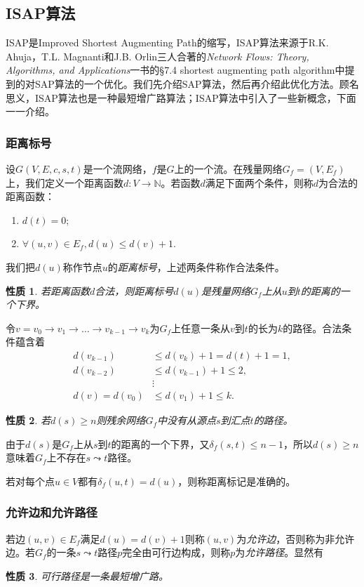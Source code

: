 \documentclass{ctexbook}
\newtheorem{property}{性质}[chapter]
\begin{document}

  \subsection{ISAP算法}
  ISAP是Improved Shortest Augmenting Path的缩写，ISAP算法来源于R.K. Ahuja，T.L. Magnanti和J.B. Orlin三人合著的\emph{Network Flows: Theory, Algorithms, and Applications}一书的\S 7.4 shortest augmenting path algorithm中提到的对SAP算法的一个优化。我们先介绍SAP算法，然后再介绍此优化方法。顾名思义，ISAP算法也是一种最短增广路算法；ISAP算法中引入了一些新概念，下面一一介绍。
  \subsubsection*{距离标号}
  设$G(V,E,c,s,t)$是一个流网络，$f$是$G$上的一个流。在残量网络$G_f=(V,E_f)$上，我们定义一个距离函数$d\colon V\to\mathbb{N}$。若函数$d$满足下面两个条件，则称$d$为合法的距离函数：
  \begin{enumerate}
      \item $d(t) = 0$;
      \item $\forall (u,v)\in E_f, d(u) \le d(v) +1$.
  \end{enumerate}
  我们把$d(u)$称作节点$u$的\emph{距离标号}，上述两条件称作合法条件。
  \begin{property}\label{P:lower_bound}
      若距离函数$d$合法，则距离标号$d(u)$是残量网络$G_f$上从$u$到$t$的距离的一个下界。
  \end{property}
  令$v=v_0\to v_1 \to\dots\to v_{k-1}\to v_k$为$G_f$上任意一条从$v$到$t$的长为$k$的路径。合法条件蕴含着
  \begin{align*}
      d(v_{k-1})&\le d(v_k)+1 = d(t)+1=1,\\
      d(v_{k-2})&\le d(v_{k-1})+1\le 2,\\
       &\vdots\\
      d(v) = d(v_0)&\le d(v_1) + 1 \le k.
  \end{align*}
  \begin{property}
      若$d(s)\ge n$则残余网络$G_f$中没有从源点$s$到汇点$t$的路径。
  \end{property}
  由于$d(s)$是$G_f$上从$s$到$t$的距离的一个下界，又$\delta_f(s,t)\le n-1$，所以$d(s)\ge n$意味着$G_f$上不存在$s\leadsto t$路径。

  若对每个点$u\in V$都有$\delta_f(u,t)=d(u)$，则称距离标记是准确的。
  \subsubsection*{允许边和允许路径}
  若边$(u,v)\in E_f$满足$d(u)=d(v)+1$则称$(u,v)$为\emph{允许边}，否则称为非允许边。若$G_f$的一条$s\leadsto t$路径$p$完全由可行边构成，则称$p$为\emph{允许路径}。显然有
  \begin{property}
    可行路径是一条最短增广路。
  \end{property}
\end{document}
